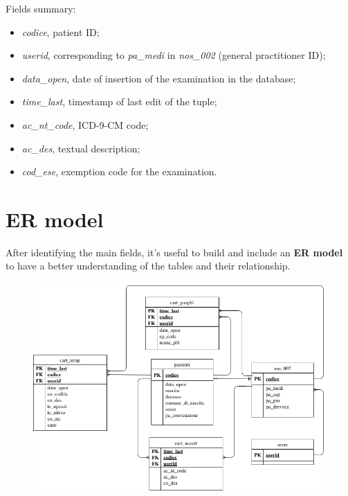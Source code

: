 Fields summary:
\begin{itemize}
	\item \textit{codice}, patient ID;
	\item \textit{userid}, corresponding to \textit{pa\_medi} in \textit{nos\_002} (general practitioner ID);
	\item \textit{data\_open}, date of insertion of the examination in the database;
	\item \textit{time\_last}, timestamp of last edit of the tuple;
	\item \textit{ac\_nt\_code}, ICD-9-CM code;
	\item \textit{ac\_des}, textual description;
	\item \textit{cod\_ese}, exemption code for the examination.
\end{itemize}

\section{ER model}
After identifying the main fields, it's useful to build and include an \textbf{ER model}\cite{draw} to have a better understanding of the tables and their relationship.
\begin{figure}[h]
	\centering
	\includegraphics[scale=0.6]{images/er.png}
\end{figure}


